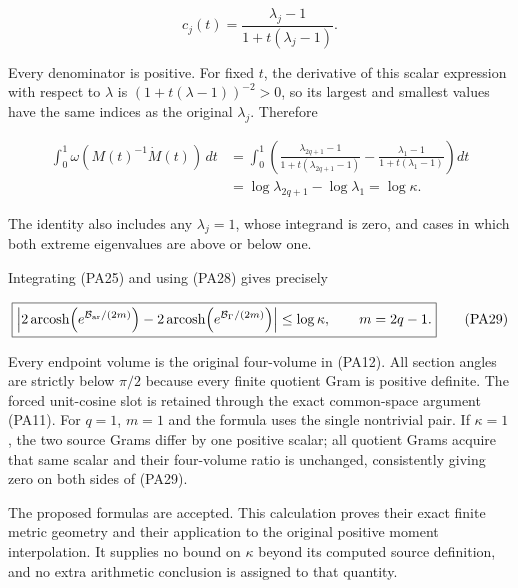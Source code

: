 \documentclass{article}
\begin{document}
\[
c_j(t)=\frac{\lambda_j-1}{1+t(\lambda_j-1)}.
\tag{PA27}
\]

Every denominator is positive. For fixed \(t\), the derivative of this scalar expression with respect to \(\lambda\) is \((1+t(\lambda-1))^{-2}>0\), so its largest and smallest values have the same indices as the original \(\lambda_j\). Therefore

\[
\begin{aligned}
\int_0^1\omega(M(t)^{-1}\dot M(t))\,dt
&=\int_0^1\left(
\frac{\lambda_{2q+1}-1}{1+t(\lambda_{2q+1}-1)}
-\frac{\lambda_1-1}{1+t(\lambda_1-1)}\right)dt\\
&=\log\lambda_{2q+1}-\log\lambda_1
=\log\kappa.
\end{aligned}
\tag{PA28}
\]

The identity also includes any \(\lambda_j=1\), whose integrand is zero, and cases in which both extreme eigenvalues are above or below one.

Integrating (PA25) and using (PA28) gives precisely

\[
\boxed{
\left|
2\operatorname{arcosh}\!\left(e^{\mathcal B_{\rm ar}/(2m)}\right)
-2\operatorname{arcosh}\!\left(e^{\mathcal B_\Gamma/(2m)}\right)
\right|
\le\log\kappa,
\qquad m=2q-1.
}
\tag{PA29}
\]

Every endpoint volume is the original four-volume in (PA12). All section angles are strictly below \(\pi/2\) because every finite quotient Gram is positive definite. The forced unit-cosine slot is retained through the exact common-space argument (PA11). For \(q=1\), \(m=1\) and the formula uses the single nontrivial pair. If \(\kappa=1\), the two source Grams differ by one positive scalar; all quotient Grams acquire that same scalar and their four-volume ratio is unchanged, consistently giving zero on both sides of (PA29).

The proposed formulas are accepted. This calculation proves their exact finite metric geometry and their application to the original positive moment interpolation. It supplies no bound on \(\kappa\) beyond its computed source definition, and no extra arithmetic conclusion is assigned to that quantity.

\endgroup
\end{document}
